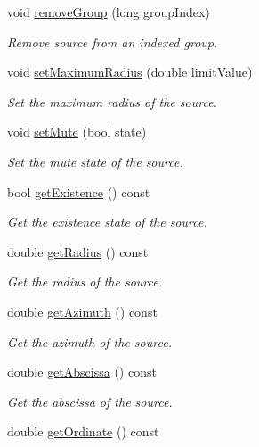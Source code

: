 \begin{DoxyCompactItemize}
void \hyperlink{class_hoa2_d_1_1_source_ac29d7c4efc09cf75b238fb5825853ad3}{remove\-Group} (long group\-Index)
\begin{DoxyCompactList}\small\item\em Remove source from an indexed group. \end{DoxyCompactList}\item 
void \hyperlink{class_hoa2_d_1_1_source_ac6e71e18e48a887d08f60f2ae3c63195}{set\-Maximum\-Radius} (double limit\-Value)
\begin{DoxyCompactList}\small\item\em Set the maximum radius of the source. \end{DoxyCompactList}\item 
void \hyperlink{class_hoa2_d_1_1_source_a343f4cef2eaf81e118d43883f05170d3}{set\-Mute} (bool state)
\begin{DoxyCompactList}\small\item\em Set the mute state of the source. \end{DoxyCompactList}\item 
bool \hyperlink{class_hoa2_d_1_1_source_aec13c7ac13d276b1635a7d8e8d3fa418}{get\-Existence} () const 
\begin{DoxyCompactList}\small\item\em Get the existence state of the source. \end{DoxyCompactList}\item 
double \hyperlink{class_hoa2_d_1_1_source_aa1ca86804bc72602d4e3d332df912452}{get\-Radius} () const 
\begin{DoxyCompactList}\small\item\em Get the radius of the source. \end{DoxyCompactList}\item 
double \hyperlink{class_hoa2_d_1_1_source_aec1cb1c94d9e0eda417fff2f4baf9567}{get\-Azimuth} () const 
\begin{DoxyCompactList}\small\item\em Get the azimuth of the source. \end{DoxyCompactList}\item 
double \hyperlink{class_hoa2_d_1_1_source_a31246db09e0e569d7c3e9d49283ccfad}{get\-Abscissa} () const 
\begin{DoxyCompactList}\small\item\em Get the abscissa of the source. \end{DoxyCompactList}\item 
double \hyperlink{class_hoa2_d_1_1_source_a4ecf39dab7526d842e894662c439b188}{get\-Ordinate} () const 

\end{DoxyCompactItemize}
